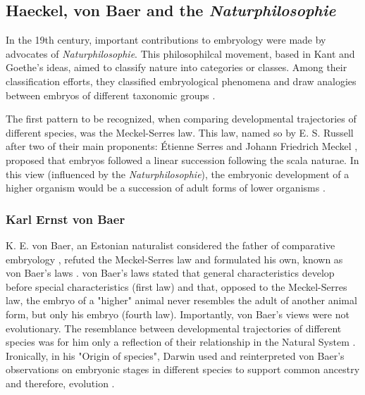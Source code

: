 \subsection{Haeckel, von Baer and the \textit{Naturphilosophie}}
In the 19th century, important contributions to embryology were made by advocates of \textit{Naturphilosophie}.
This philosophilcal movement, based in Kant and Goethe's ideas, aimed to classify nature into categories or classes. Among their classification efforts, they classified embryological phenomena and draw analogies between embryos of different taxonomic groups  \citep{Horder2010,Ghiselin2005}.

The first pattern to be recognized, when comparing developmental trajectories of different species, was the Meckel-Serres law. 
This law, named so by E. S. Russell after two of their main proponents: \'{E}tienne Serres and Johann Friedrich Meckel \citep{Russell1916}, proposed that embryos followed a linear succession following the scala naturae.
In this view (influenced by the \textit{Naturphilosophie}), the embryonic development of a higher organism would be a succession of adult forms of lower organisms \citep{Russell1916,amundson2005changing}.

\subsubsection{Karl Ernst von Baer}

K. E. von Baer, an Estonian naturalist considered the father of comparative embryology \citep{Russell1916}, refuted the Meckel-Serres law and formulated his own, known as von Baer's laws \citep{vonBaer1828uber}. 
von Baer's laws stated that general characteristics develop before special characteristics (first law) and that, opposed to the Meckel-Serres law, the embryo of a "higher" animal never resembles the adult of another animal form, but only his embryo (fourth law). 
Importantly, von Baer's views were not evolutionary. The resemblance between developmental trajectories of different species was for him only a reflection of their relationship in the Natural System \citep{amundson2005changing}.
Ironically, in his "Origin of species", Darwin used and reinterpreted von Baer's observations on embryonic stages in different species to support common ancestry and therefore, evolution \citep{darwin1859origin}.

